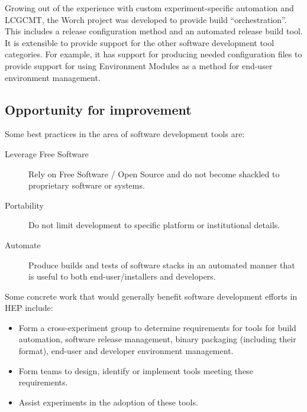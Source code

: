 Growing out of the experience with custom experiment-specific
automation and LCGCMT, the Worch project was developed to provide
build ``orchestration''.  This includes a release configuration method
and an automated release build tool.  It is extensible to provide
support for the other software development tool categories.  For
example, it has support for producing needed configuration files to
provide support for using Environment Modules as a method for end-user
environment management.


\subsection{Opportunity for improvement}

Some best practices in the area of software development tools are:

\begin{description}
\item[Leverage Free Software] Rely on Free Software / Open Source and
  do not become shackled to proprietary software or systems.
\item[Portability] Do not limit development to specific platform or
  institutional details.
\item[Automate] Produce builds and tests of software stacks in an
  automated manner that is useful to both end-user/installers and
  developers.
\end{description}

\noindent Some concrete work that would generally benefit software development efforts in HEP include:

\begin{itemize}
\item Form a cross-experiment group to determine requirements for
  tools for build automation, software release management, binary
  packaging (including their format), end-user and developer
  environment management.
\item Form teams to design, identify or implement tools meeting these
  requirements.
\item Assist experiments in the adoption of these tools.
\end{itemize}

